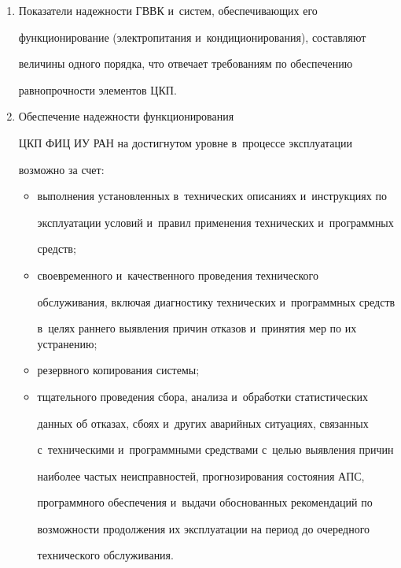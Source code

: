 \noindent

\begin{enumerate}[1.]

  \item Показатели надежности ГВВК и~систем, обеспечивающих его 

функционирование (электропитания и~кондиционирования), составляют 

величины одного порядка, что отвечает требованиям по обеспечению 

равнопрочности элементов ЦКП.

  \item Обеспечение надежности функционирования 

ЦКП ФИЦ ИУ РАН на достигнутом уровне в~процессе эксплуатации 

возможно за счет:

  \begin{itemize}

  \item выполнения установленных в~технических описаниях и~инструкциях по 

эксплуатации условий и~правил применения технических и~программных 

средств;

  \item своевременного и~качественного проведения технического 

обслуживания, включая диагностику технических и~программных средств 

в~целях раннего выявления причин отказов и~принятия мер по их устранению;

  \item резервного копирования системы;

  \item тщательного проведения сбора, анализа и~обработки статистических 

данных об отказах, сбоях и~других аварийных ситуациях, связанных 

с~техническими и~программными средствами с~целью выявления причин 

наиболее частых неисправностей, прогнозирования состояния АПС, 

программного обеспечения и~выдачи обоснованных рекомендаций по 

возможности продолжения их эксплуатации на период до очередного 

технического обслуживания.

  \end{itemize}

  \end{enumerate}

